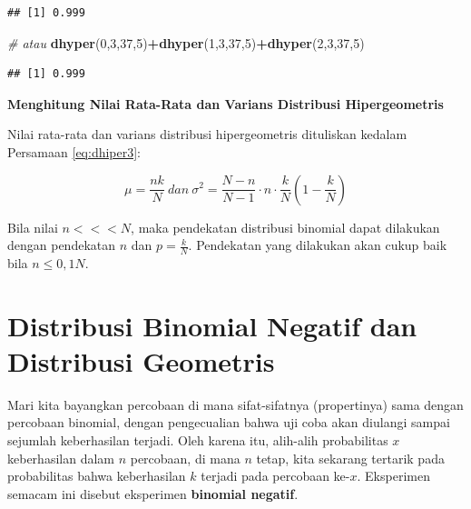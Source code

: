 \documentclass[]{book}
\newenvironment{Shaded}{\begin{snugshade}}{\end{snugshade}}
\newcommand{\KeywordTok}[1]{\textcolor[rgb]{0.13,0.29,0.53}{\textbf{#1}}}
\newcommand{\DecValTok}[1]{\textcolor[rgb]{0.00,0.00,0.81}{#1}}
\newcommand{\CommentTok}[1]{\textcolor[rgb]{0.56,0.35,0.01}{\textit{#1}}}
\newcommand{\OperatorTok}[1]{\textcolor[rgb]{0.81,0.36,0.00}{\textbf{#1}}}
\newcommand{\NormalTok}[1]{#1}
\begin{document}
\begin{verbatim}
## [1] 0.999
\end{verbatim}

\begin{Shaded}
\begin{Highlighting}[]
\CommentTok{# atau}
\KeywordTok{dhyper}\NormalTok{(}\DecValTok{0}\NormalTok{,}\DecValTok{3}\NormalTok{,}\DecValTok{37}\NormalTok{,}\DecValTok{5}\NormalTok{)}\OperatorTok{+}\KeywordTok{dhyper}\NormalTok{(}\DecValTok{1}\NormalTok{,}\DecValTok{3}\NormalTok{,}\DecValTok{37}\NormalTok{,}\DecValTok{5}\NormalTok{)}\OperatorTok{+}\KeywordTok{dhyper}\NormalTok{(}\DecValTok{2}\NormalTok{,}\DecValTok{3}\NormalTok{,}\DecValTok{37}\NormalTok{,}\DecValTok{5}\NormalTok{)}
\end{Highlighting}
\end{Shaded}

\begin{verbatim}
## [1] 0.999
\end{verbatim}

\textbf{Menghitung Nilai Rata-Rata dan Varians Distribusi
Hipergeometris}

Nilai rata-rata dan varians distribusi hipergeometris dituliskan kedalam
Persamaan \eqref{eq:dhiper3}:

\begin{equation}
   \mu=\frac{nk}{N}\ dan\ \sigma^2=\frac{N-n}{N-1}\cdot n\cdot\frac{k}{N}\left(1-\frac{k}{N}\right)
  \label{eq:dhiper3}
\end{equation}

Bila nilai \(n<<<N\), maka pendekatan distribusi binomial dapat
dilakukan dengan pendekatan \(n\) dan \(p=\frac{k}{N}\). Pendekatan yang
dilakukan akan cukup baik bila \(n\le0,1N\).

\section{Distribusi Binomial Negatif dan Distribusi
Geometris}\label{distribusi-binomial-negatif-dan-distribusi-geometris}

Mari kita bayangkan percobaan di mana sifat-sifatnya (propertinya) sama
dengan percobaan binomial, dengan pengecualian bahwa uji coba akan
diulangi sampai sejumlah keberhasilan terjadi. Oleh karena itu,
alih-alih probabilitas \(x\) keberhasilan dalam \(n\) percobaan, di mana
\(n\) tetap, kita sekarang tertarik pada probabilitas bahwa keberhasilan
\(k\) terjadi pada percobaan ke-\(x\). Eksperimen semacam ini disebut
eksperimen \textbf{binomial negatif}.
\end{document}
